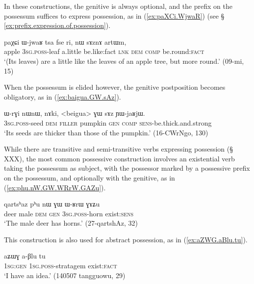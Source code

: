 In these constructions, the genitive is always optional, and the prefix on the possessum suffices to express possession, as in (\ref{ex:paXCi.WjwaR}) (see § \ref{ex:prefix.expression.of.possession}).

\begin{exe}
\ex \label{ex:paXCi.WjwaR}
\gll paχɕi ɯ-jwaʁ tsa fse ri, nɯ sɤznɤ artɯm,\\
apple \textsc{3sg}.\textsc{poss}-leaf a.little be.like:fact \textsc{lnk} \textsc{dem} \textsc{comp} be.round:\textsc{fact} \\
\glt `(Its leaves) are a little like the leaves of an apple tree, but more round.' (09-mi, 15)
\end{exe}

When the possessum is elided however, the genitive postposition becomes obligatory, as in (\ref{ex:baigua.GW.sAz}).

\begin{exe}
\ex \label{ex:baigua.GW.sAz}
\gll ɯ-rɣi nɯnɯ, nɤki, <beigua> ɣɯ sɤz ɲɯ-jaʁjɯ. \\
\textsc{3sg}.\textsc{poss}-seed \textsc{dem} \textsc{filler}  pumpkin \textsc{gen} \textsc{comp} \textsc{sens}-be.thick.and.strong \\
\glt `Its seeds are thicker than those of the pumpkin.' (16-CWrNgo, 130)
\end{exe}

While there are transitive and semi-transitive verbs expressing possession (§ XXX), the most common possessive construction involves an existential verb taking the possessum as subject, with the possessor marked by a possessive prefix on the possessum, and optionally with the genitive, as in (\ref{ex:phu.nW.GW.WRrW.GAZu}). 

\begin{exe}
\ex \label{ex:phu.nW.GW.WRrW.GAZu}
\gll qartsʰaz pʰu nɯ ɣɯ ɯ-ʁrɯ ɣɤʑu \\
deer male \textsc{dem} \textsc{gen} \textsc{3sg}.\textsc{poss}-horn exist:\textsc{sens} \\
\glt `The male deer has horns.' (27-qartshAz, 32)
\end{exe}

This construction is also used for abstract possession, as in (\ref{ex:aZWG.aBlu.tu}).

\begin{exe}
\ex \label{ex:aZWG.aBlu.tu}
\gll aʑɯɣ a-βlu tu \\
\textsc{1sg}:\textsc{gen} \textsc{1sg}.\textsc{poss}-stratagem exist:\textsc{fact} \\
\glt `I have an idea.' (140507 tangguowu, 29)
\end{exe}

